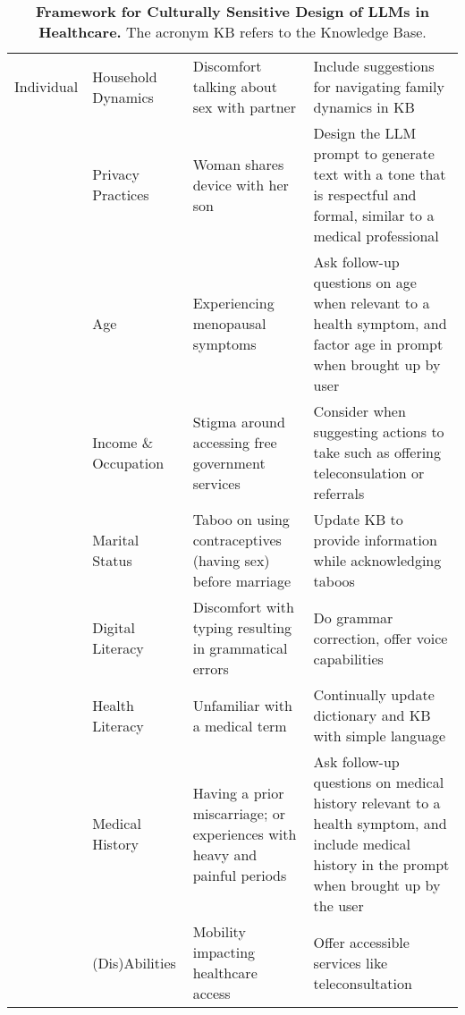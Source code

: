 \begin{table*}[h]
\begin{tabular}{>{\raggedright\arraybackslash}p{1.2cm} p{2.6cm} p{4.3cm} p{6cm}}
Individual & Household Dynamics & Discomfort talking about sex with partner & Include suggestions for navigating family dynamics in KB \\
 & Privacy Practices & Woman shares device with her son & Design the LLM prompt to generate text with a tone that is respectful and formal, similar to a medical professional\\
 & Age & Experiencing menopausal symptoms & Ask follow-up questions on age when relevant to a health symptom, and factor age in prompt when brought up by user \\
 & Income \& Occupation & Stigma around accessing free government services & Consider when suggesting actions to take such as offering teleconsulation or referrals \\
 & Marital Status & Taboo on using contraceptives (having sex) before marriage & Update KB to provide information while acknowledging taboos \\
 & Digital Literacy & Discomfort with typing resulting in grammatical errors & Do grammar correction, offer voice capabilities \\
 & Health Literacy & Unfamiliar with a medical term & Continually update dictionary and KB with simple language\\
 & Medical History & Having a prior miscarriage; or experiences with heavy and painful periods & Ask follow-up questions on medical history relevant to a health symptom, and include medical history in the prompt when brought up by the user \\
 & (Dis)Abilities & Mobility impacting healthcare access & Offer accessible services like teleconsultation \\ 
\bottomrule
  \end{tabular}
    \vspace{-5pt}
 \caption{\textbf{Framework for Culturally Sensitive Design of LLMs in Healthcare.} The acronym KB refers to the Knowledge Base.}
  \label{tab:framework}
  \end{table*}


